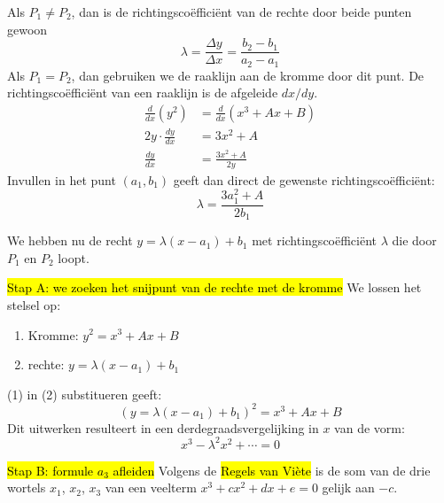 
Als $P_1 \neq P_2$, dan is de richtingscoëfficiënt van de rechte door beide punten gewoon
\begin{equation*}
    \lambda = \frac{\Delta y}{\Delta x} = \frac{b_2 - b_1}{a_2 - a_1}
\end{equation*}
Als $P_1 = P_2$, dan gebruiken we de raaklijn aan de kromme door dit punt. De richtingscoëfficiënt van een raaklijn is de afgeleide $dx/dy$.
\begin{equation*}
    \begin{aligned}
        \frac{d}{dx}(y^2) &= \frac{d}{dx}(x^3 + Ax + B) \\
        2y \cdot \frac{dy}{dx} &= 3x^2 + A \\
        \frac{dy}{dx} &= \frac{3x^2 + A}{2y}
    \end{aligned}
\end{equation*}
Invullen in het punt $(a_1, b_1)$ geeft dan direct de gewenste richtingscoëfficiënt:
\begin{equation*}
    \lambda = \frac{3a_1^2 + A}{2b_1}
\end{equation*}


We hebben nu de recht $y = \lambda(x-a_1) + b_1$ met richtingscoëfficiënt $\lambda$ die door $P_1$ en $P_2$ loopt. 

\hl{Stap A: we zoeken het snijpunt van de rechte met de kromme} \newline
We lossen het stelsel op:
\begin{enumerate}
    \item Kromme: $y^2 = x^3 + Ax + B$
    \item rechte: $y = \lambda(x-a_1) + b_1$
\end{enumerate}
(1) in (2) substitueren geeft:
\begin{equation*}
    \left(y = \lambda(x-a_1) + b_1\right)^2 = x^3 + Ax + B
\end{equation*}
Dit uitwerken resulteert in een derdegraadsvergelijking in $x$ van de vorm:
\begin{equation*}
    x^3 - \lambda^2 x^2 + \cdots = 0 
\end{equation*}

\hl{Stap B: formule $a_3$ afleiden} \newline
Volgens de \hl{Regels van Viète} is de som van de drie wortels $x_1$, $x_2$, $x_3$ van een veelterm $x^3 + cx^2 + dx + e = 0$ gelijk aan $-c$.

